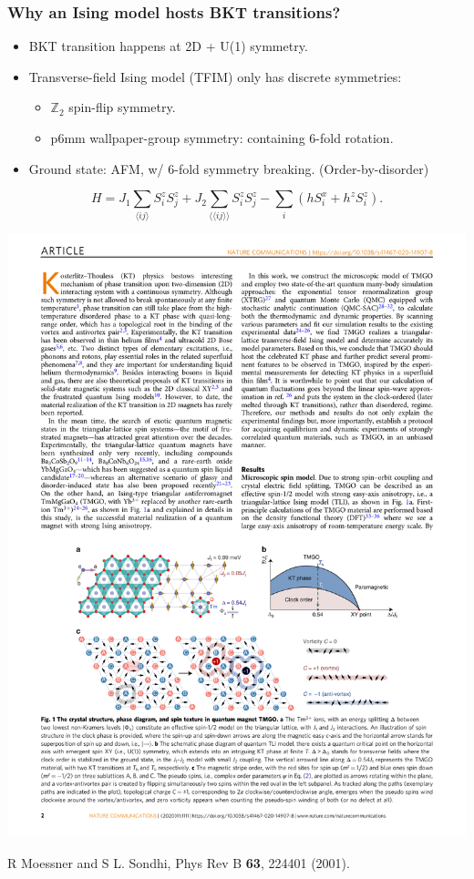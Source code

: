 \documentclass[xcolor=table, aspectratio=1610,ignorenonframetext]{beamer}
\begin{document}
\begin{frame}
  \frametitle{Why an Ising model hosts BKT transitions?}
  \begin{itemize}
    \item BKT transition happens at 2D + U(1) symmetry.
    \item Transverse-field Ising model (TFIM) only has discrete symmetries:
    \begin{itemize}
      \item $\mathbb Z_2$ spin-flip symmetry.
      \item p6mm wallpaper-group symmetry: containing 6-fold rotation.
    \end{itemize}
      \item Ground state: AFM, w/ 6-fold symmetry breaking. (Order-by-disorder)
  \end{itemize}
  \[H = J_1\sum_{\langle ij\rangle}S_i^zS_j^z +J_2\sum_{\langle\langle ij\rangle\rangle}S_i^zS_j^z - \sum_i\left(hS_i^x + h^zS_i^z\right). \]

  \begin{center}
    \includegraphics{lattice-afm}
  \end{center}
  {\footnotesize R Moessner and S L. Sondhi, Phys Rev B \textbf{63}, 224401 (2001).}
\end{frame}
\end{document}
